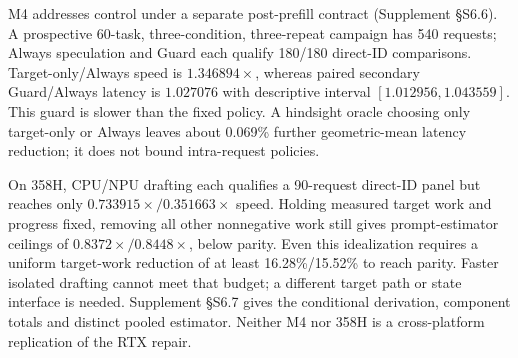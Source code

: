 M4 addresses control under a separate post-prefill contract (Supplement \S S6.6). A prospective 60-task, three-condition, three-repeat campaign has 540 requests; Always speculation and Guard each qualify 180/180 direct-ID comparisons. Target-only/Always speed is $1.346894\times$, whereas paired secondary Guard/Always latency is $1.027076$ with descriptive interval $[1.012956,1.043559]$. This guard is slower than the fixed policy. A hindsight oracle choosing only target-only or Always leaves about 0.069\% further geometric-mean latency reduction; it does not bound intra-request policies.

On 358H, CPU/NPU drafting each qualifies a 90-request direct-ID panel but reaches only $0.733915\times/0.351663\times$ speed. Holding measured target work and progress fixed, removing all other nonnegative work still gives prompt-estimator ceilings of $0.8372\times/0.8448\times$, below parity. Even this idealization requires a uniform target-work reduction of at least 16.28\%/15.52\% to reach parity. Faster isolated drafting cannot meet that budget; a different target path or state interface is needed. Supplement \S S6.7 gives the conditional derivation, component totals and distinct pooled estimator. Neither M4 nor 358H is a cross-platform replication of the RTX repair.
\FloatBarrier
